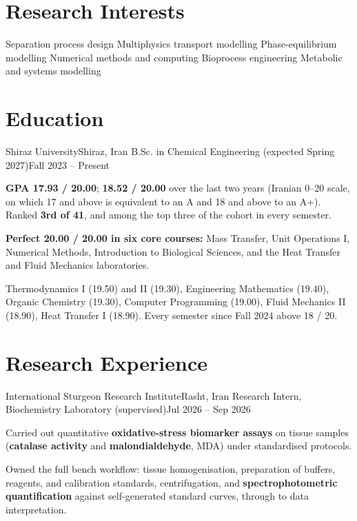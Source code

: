 \documentclass[a4paper,11pt]{article}
\newcommand{\institution}{Shiraz University}
\newcommand{\location}{Shiraz, Iran}
\newcommand{\lab}{International Sturgeon Research Institute}
\begin{document}

\section{Research Interests}
\cvInterestGrid
  {Separation process design}
  {Multiphysics transport modelling}
  {Phase-equilibrium modelling}
  {Numerical methods and computing}
  {Bioprocess engineering}
  {Metabolic and systems modelling}

\section{Education}
\cvListStart
  \cvEntry
    {\institution}{\location}
    {B.Sc. in Chemical Engineering (expected Spring 2027)}{Fall 2023 -- Present}
    \cvBulletsStart
      \item \textbf{GPA 17.93 / 20.00}; \textbf{18.52 / 20.00} over the last two years (Iranian 0--20 scale, on which 17 and above is equivalent to an A and 18 and above to an A+). Ranked \textbf{3rd of 41}, and among the top three of the cohort in every semester.
      \item \textbf{Perfect 20.00 / 20.00 in six core courses:} Mass Transfer, Unit Operations I, Numerical Methods, Introduction to Biological Sciences, and the Heat Transfer and Fluid Mechanics laboratories.
      \item Thermodynamics I (19.50) and II (19.30), Engineering Mathematics (19.40), Organic Chemistry (19.30), Computer Programming (19.00), Fluid Mechanics II (18.90), Heat Transfer I (18.90). Every semester since Fall 2024 above 18 / 20.
    \cvBulletsEnd
\cvListEnd

\section{Research Experience}
\cvListStart

  \cvEntry
    {\lab}{Rasht, Iran}
    {Research Intern, Biochemistry Laboratory (supervised)}{Jul 2026 -- Sep 2026}
    \cvBulletsStart
      \item Carried out quantitative \textbf{oxidative-stress biomarker assays} on tissue samples (\textbf{catalase activity} and \textbf{malondialdehyde}, MDA) under standardised protocols.
      \item Owned the full bench workflow: tissue homogenisation, preparation of buffers, reagents, and calibration standards, centrifugation, and \textbf{spectrophotometric quantification} against self-generated standard curves, through to data interpretation.
    \cvBulletsEnd
\end{document}
